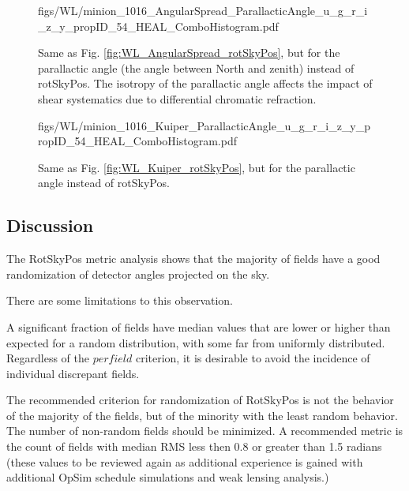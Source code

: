 
\begin{figure}[tbh!]
        {figs/WL/minion_1016_AngularSpread_ParallacticAngle_u_g_r_i_z_y_propID_54_HEAL_ComboHistogram.pdf}
\caption{Same as Fig. \ref{fig:WL_AngularSpread_rotSkyPos}, but for the parallactic angle (the angle
    between North and zenith) instead of rotSkyPos.  The isotropy of the parallactic angle affects
    the impact of shear systematics due to differential chromatic refraction.}
\label{fig:WL_AngularSpread_ParallacticAngle}
\end{figure}

\begin{figure}[tbh!]
        {figs/WL/minion_1016_Kuiper_ParallacticAngle_u_g_r_i_z_y_propID_54_HEAL_ComboHistogram.pdf}
\caption{Same as Fig. \ref{fig:WL_Kuiper_rotSkyPos}, but for the parallactic angle instead of
    rotSkyPos.}
\label{fig:WL_Kuiper_ParallacticAngle}
\end{figure}


\subsection{Discussion}

The RotSkyPos metric analysis shows that the majority of fields have a
good randomization of detector angles projected on the sky.

There are some limitations to this observation.


A significant fraction of fields  have median values that are
lower or higher than expected for a random distribution, with some far
from uniformly distributed.  Regardless of the $per field$ criterion,
it is desirable to avoid the incidence of individual discrepant
fields.

The recommended criterion for randomization of RotSkyPos is not the
behavior of the majority of the fields, but of the minority with the
least random behavior.  The number of non-random fields should be
minimized.  A recommended metric is the count of fields with median
RMS less then 0.8 or greater than 1.5 radians (these values to be
reviewed again as additional experience is gained with additional
OpSim schedule simulations and weak lensing analysis.)

